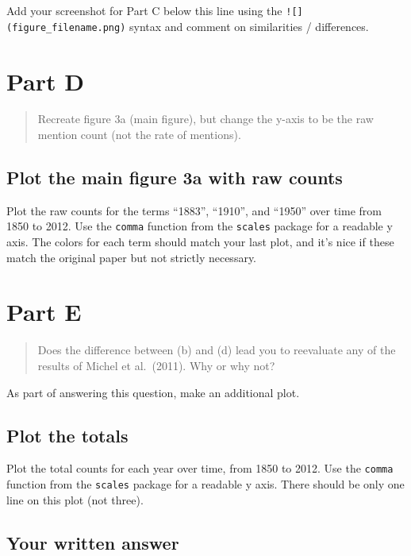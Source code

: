 \documentclass[
]{article}
\begin{document}
Add your screenshot for Part C below this line using the
\texttt{!{[}{]}(figure\_filename.png)} syntax and comment on
similarities / differences.

\hypertarget{part-d}{%
\section{Part D}\label{part-d}}

\begin{quote}
Recreate figure 3a (main figure), but change the y-axis to be the raw
mention count (not the rate of mentions).
\end{quote}

\hypertarget{plot-the-main-figure-3a-with-raw-counts}{%
\subsection{Plot the main figure 3a with raw
counts}\label{plot-the-main-figure-3a-with-raw-counts}}

Plot the raw counts for the terms ``1883'', ``1910'', and ``1950'' over
time from 1850 to 2012. Use the \texttt{comma} function from the
\texttt{scales} package for a readable y axis. The colors for each term
should match your last plot, and it's nice if these match the original
paper but not strictly necessary.

\hypertarget{part-e}{%
\section{Part E}\label{part-e}}

\begin{quote}
Does the difference between (b) and (d) lead you to reevaluate any of
the results of Michel et al.~(2011). Why or why not?
\end{quote}

As part of answering this question, make an additional plot.

\hypertarget{plot-the-totals}{%
\subsection{Plot the totals}\label{plot-the-totals}}

Plot the total counts for each year over time, from 1850 to 2012. Use
the \texttt{comma} function from the \texttt{scales} package for a
readable y axis. There should be only one line on this plot (not three).

\hypertarget{your-written-answer-3}{%
\subsection{Your written answer}\label{your-written-answer-3}}
\end{document}
